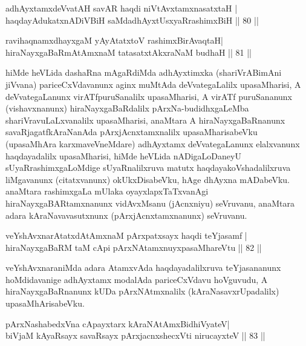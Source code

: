 \begin{shl}
adhAyxtamxdeVvatAH savAR haqdi niVtAvx\s \s tamxnasatxtaH |\\
haqdayAdukatxnADiVBiH saMdadhAyxtUsxyaRrashimxBiH \hfill || 80 || 
\end{shl}

\begin{shl}
ravihaqnamxdhayxgaM yAyAtatxtoV rashimxBirAvaqtaH|\\
hiraNayxgaBaRmAtAmxnaM tatasatxtAkxraNaM budhaH \hfill || 81 || 
\end{shl}

\begin{artha}
hiMde heVLida dashaRna mAgaRdiMda adhAyxtimxka (shariVrABimAni jiVvana) pariceCxVdavanunx aginx muMtAda deVvategaLalilx upasaMharisi, A deVvategaLanunx virATfpuruSanalilx upasaMharisi, A virATf puruSananunx (vishavxnanunx) hiraNayxgaBaRdalilx pArxNa-budidhxgaLeMba shariVravuLaLxvanalilx upasaMharisi, anaMtara A hiraNayxgaBaRnanunx savaRjagatfkAraNanAda pArxjAcnxtamxnalilx upasaMharisabeVku (upasaMhAra karxmaveVneMdare) adhAyxtamx deVvategaLanunx elalxvanunx haqdayadalilx upasaMharisi, hiMde heVLida nADigaLoDaneyU sUyaRrashimxgaLoMdige sUyaRnalilxruva matutx haqdayakoVshadalilxruva liMgavanunx (citatxvanunx) okUkxDisabeVku, hAge dhAyxna mADabeVku. anaMtara rashimxgaLa mUlaka oyayxlapxTaTxvanAgi hiraNayxgaBARtamxnanunx vidAvxMsanu (jAcnxniyu) seVruvanu, anaMtara adara kAraNavavasutxnunx (pArxjAcnxtamxnanunx) seVruvanu.
\end{artha}


\begin{shl}
veYshAvxnarAtatxdAtAmxnaM pArxpatxsayx haqdi teYjasamf |\\
hiraNayxgaBaRM taM cApi pArxNAtamxnuyxpasaMhareVtu \hfill || 82 || 
\end{shl}

\begin{artha}
veYshAvxnaraniMda adara AtamxvAda haqdayadalilxruva teYjasananunx hoMdidavanige adhAyxtamx modalAda pariceCxVdavu hoVguvudu, A hiraNayxgaBaRnanunx kUDa pArxNAtmxnalilx (kAraNasavxrUpadalilx) upasaMhArisabeVku.
\end{artha}


\begin{shl}
pArxNashabedxVna cApayxtarx kAraNAtAmx\s BidhiVyateV|\\
biVjaM kAyaRsayx savaRsayx pArxjacnxshecxVti nirucayxteV \hfill || 83 || 
\end{shl}

